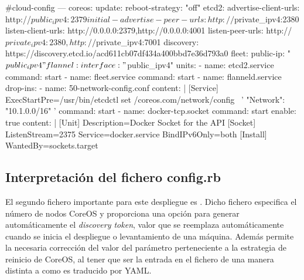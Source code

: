 \begin{codelisting}
\label{code:cloud-config1}
\begin{code}
#cloud-config
---
coreos:
  update:
    reboot-strategy: "off"
  etcd2:
    advertise-client-urls: http://$public_ipv4:2379
    initial-advertise-peer-urls: http://$private_ipv4:2380
    listen-client-urls: http://0.0.0.0:2379,http://0.0.0.0:4001
    listen-peer-urls: http://$private_ipv4:2380,http://$private_ipv4:7001
    discovery: https://discovery.etcd.io/acd611cb07df434a400bbd7e36d793a0
  fleet:
    public-ip: "$public_ipv4"
  flannel:
    interface: "$public_ipv4"
  units:
  - name: etcd2.service
    command: start
  - name: fleet.service
    command: start
  - name: flanneld.service
    drop-ins:
    - name: 50-network-config.conf
      content: |
        [Service]
        ExecStartPre=/usr/bin/etcdctl set /coreos.com/network/config \
        '{ "Network": "10.1.0.0/16" }'
    command: start
  - name: docker-tcp.socket
    command: start
    enable: true
    content: |
      [Unit]
      Description=Docker Socket for the API
      [Socket]
      ListenStream=2375
      Service=docker.service
      BindIPv6Only=both
      [Install]
      WantedBy=sockets.target
\end{code}
\end{codelisting}

\subsection{Interpretación del fichero config.rb}

El segundo fichero importante para este despliegue es . Dicho fichero especifica el número de nodos CoreOS y proporciona una opción para generar automáticamente el \textit{discovery token}, valor que se reemplaza automáticamente cuando se inicia el despliegue o levantamiento de una máquina. Además permite la necesaria corrección del valor del parámetro perteneciente a la estrategia de reinicio de CoreOS, al tener que ser la entrada en el fichero  de una manera distinta a como es traducido por YAML.

